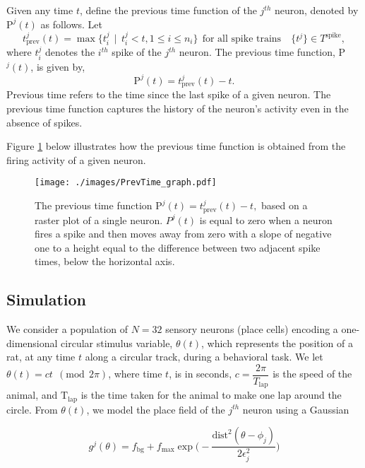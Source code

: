 Given any time $t$, define the previous time function of the $j^{th}$ neuron, denoted by $\text{P}^{j}(t)$ as follows. Let 
\[
t^{j}_{\text{prev}}(t) = \displaystyle \max  \{  t^{j}_{i} \ \ | \ \ t^{j}_{i} < t, 1 \leq i \leq n_{i} \} \ \ \text{for all spike trains} \quad  \{t^{j}\} \in T^{\text{spike}}, 
\]
where $t^j_i$ denotes the $i^{th}$ spike of the $j^{th}$ neuron.  The previous time function, P$^{j}(t)$, is given by, 
\begin{equation}\label{prevtimefun}
\text{P}^{j}(t) = t^{j}_{\text{prev}}(t) - t.
\end{equation}
Previous time refers to the time since the last spike of a given neuron. The previous time function captures the history of the neuron's  activity even in the absence of spikes.

Figure \ref{fig:PrevTime} below illustrates how the previous time function is obtained from the firing activity of a given neuron.


 \begin{figure}[H]
        \centering
          \texttt{[image: ./images/PrevTime\_graph.pdf]}
           \caption[]
            {\small The previous time function $\text{P}^{j}(t) = t^{j}_{\text{prev}}(t) - t,$ based on a raster plot of a single neuron.   $P^{j}(t)$ is equal to zero when a neuron fires a spike  and then moves away from zero with a slope of negative one to a height equal to the difference between two adjacent spike times, below the horizontal axis. } 
             \label{fig:PrevTime}
  \end{figure}


\subsection{Simulation}
We consider a population of $N=32$ sensory neurons (place cells) encoding a 
one-dimensional circular stimulus variable, $\theta(t)$, which represents 
the position of a rat, at any time $t$ along a circular track, during a behavioral task.
We let $\theta(t) = c t \ \ (\text{mod} \ \ 2\pi)$, where time $t$, is in seconds, $c = \dfrac{2\pi}{T_{\text{lap}}}$ is the speed of the animal, and
$\text{T}_{\text{lap}}$ is the time taken for the animal to make one lap around the circle.
From  $\theta(t)$,  we model the place field of the $j^{th}$ neuron using a Gaussian 

\begin{equation}
{g}^{j}(\theta) = \displaystyle  f_{\text{bg}} + f_{\max} 
\exp\bigg(-\dfrac{\text{dist}^{2}(\theta - \phi_{j})}{2\epsilon_{j}^{2}} \bigg)
\end{equation}

